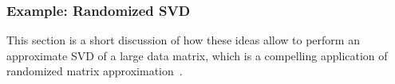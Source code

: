 \documentclass[12pt]{article}
\begin{document}

\subsubsection{Example: Randomized SVD}
\label{sec:pca}

This section is a short discussion of how these ideas allow to perform an approximate SVD of a large data matrix,
which is a compelling application of randomized matrix approximation~\cite{tygert_szlam}.

\end{document}
